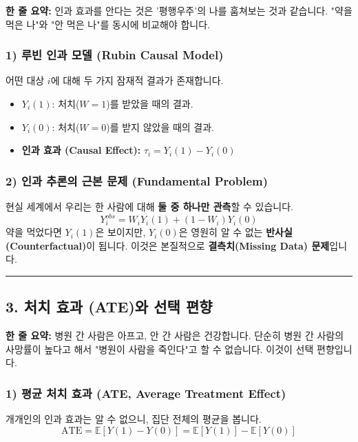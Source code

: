 \documentclass[11pt,a4paper]{book}
\theoremstyle{definition}
\begin{document}
\begin{conceptbox}[title={개념 2: 가지 않은 길 (The Road Not Taken)}]
\textbf{한 줄 요약:} 인과 효과를 안다는 것은 '평행우주'의 나를 훔쳐보는 것과 같습니다. "약을 먹은 나"와 "안 먹은 나"를 동시에 비교해야 합니다.
\end{conceptbox}

\subsubsection*{1) 루빈 인과 모델 (Rubin Causal Model)}
어떤 대상 $i$에 대해 두 가지 잠재적 결과가 존재합니다.
\begin{itemize}
    \item $Y_i(1)$: 처치($W=1$)를 받았을 때의 결과.
    \item $Y_i(0)$: 처치($W=0$)를 받지 않았을 때의 결과.
    \item \textbf{인과 효과 (Causal Effect):} $\tau_i = Y_i(1) - Y_i(0)$
\end{itemize}

\subsubsection*{2) 인과 추론의 근본 문제 (Fundamental Problem)}
현실 세계에서 우리는 한 사람에 대해 \textbf{둘 중 하나만 관측}할 수 있습니다.
$$ Y_i^{obs} = W_i Y_i(1) + (1-W_i) Y_i(0) $$
약을 먹었다면 $Y_i(1)$은 보이지만, $Y_i(0)$은 영원히 알 수 없는 \textbf{반사실(Counterfactual)}이 됩니다. 이것은 본질적으로 \textbf{결측치(Missing Data) 문제}입니다.

\vspace{0.5cm}\hrule\vspace{0.5cm}

\subsection{3. 처치 효과 (ATE)와 선택 편향}

\begin{conceptbox}[title={개념 3: 비교할 수 없는 것을 비교하지 마라}]
\textbf{한 줄 요약:} 병원 간 사람은 아프고, 안 간 사람은 건강합니다. 단순히 병원 간 사람의 사망률이 높다고 해서 "병원이 사람을 죽인다"고 할 수 없습니다. 이것이 선택 편향입니다.
\end{conceptbox}

\subsubsection*{1) 평균 처치 효과 (ATE, Average Treatment Effect)}
개개인의 인과 효과는 알 수 없으니, 집단 전체의 평균을 봅니다.
$$ \text{ATE} = \mathbb{E}[Y(1) - Y(0)] = \mathbb{E}[Y(1)] - \mathbb{E}[Y(0)] $$
\end{document}
